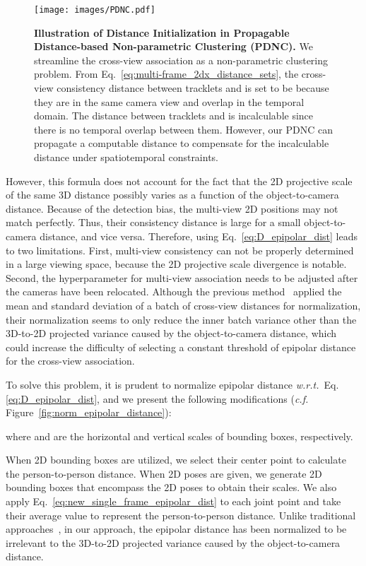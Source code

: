 \documentclass{CVM}
\begin{document}
  \begin{figure}[!h]
    \centering
    \texttt{[image: images/PDNC.pdf]}
    \caption{\textbf{Illustration of Distance Initialization in Propagable Distance-based Non-parametric Clustering (PDNC).} We streamline the cross-view association as a non-parametric clustering problem. From Eq.~\eqref{eq:multi-frame_2dx_distance_sets}, the cross-view consistency distance between tracklets  and  is set to be  because they are in the same camera view and overlap in the temporal domain. The distance between tracklets  and  is incalculable since there is no temporal overlap between them. However, our PDNC can propagate a computable distance to compensate for the incalculable distance under spatiotemporal constraints.
    }\label{fig:PDNC}
  \end{figure}
  
  
 However, this formula does not account for the fact that the 2D projective scale of the same 3D distance possibly varies as a function of the object-to-camera distance. Because of the detection bias, the multi-view 2D positions may not match perfectly. Thus, their consistency distance is large for a small object-to-camera distance, and vice versa. Therefore, using Eq.~\eqref{eq:D_epipolar_dist} leads to two limitations. First, multi-view consistency can not be properly determined in a large viewing space, because the 2D projective scale divergence is notable. Second, the hyperparameter for multi-view association needs to be adjusted after the cameras have been relocated.  Although the previous method~\cite{dong2019fast} applied the mean and standard deviation of a batch of cross-view distances for normalization, their normalization seems to only reduce the inner batch variance other than the 3D-to-2D projected variance caused by the object-to-camera distance, which could increase the difficulty of selecting a constant threshold of epipolar distance for the cross-view association.

 


To solve this problem, it is prudent to normalize epipolar distance \textit{w.r.t.}~Eq.\ref{eq:D_epipolar_dist}, and we present the following modifications (\textit{c.f.} Figure~\ref{fig:norm_epipolar_distance}):
  
where  and  are the horizontal and vertical scales of bounding boxes, respectively.

When 2D bounding boxes are utilized, we select their center point to calculate the person-to-person distance. When 2D poses are given, we generate 2D bounding boxes that encompass the 2D poses to obtain their scales. We also apply Eq.~\eqref{eq:new_single_frame_epipolar_dist} to each joint point and take their average value to represent the person-to-person distance. Unlike traditional approaches~\cite{he2020multi,chen2020multi,chen2020cross,ohashi20vmocap,dong2021fast}, in our approach, the epipolar distance has been normalized to be irrelevant to the 3D-to-2D projected variance caused by the object-to-camera distance.
\end{document}
